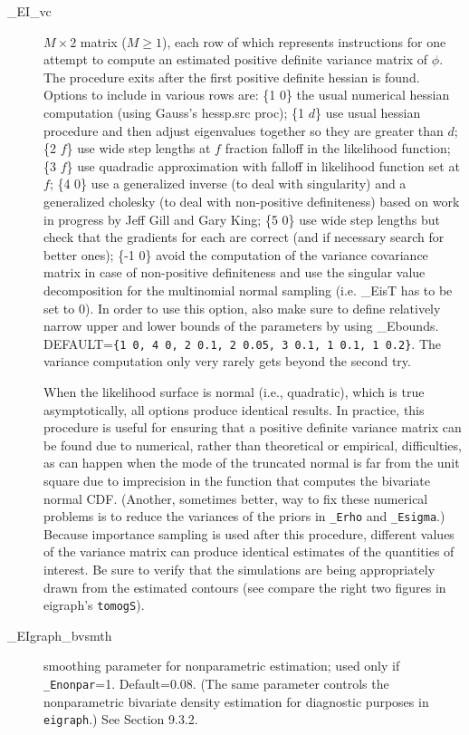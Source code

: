 \documentclass[11pt,titlepage]{article}
\begin{document}
\begin{description}
\item[\_EI\_vc] $M\times 2$ matrix ($M\geq 1$), each row of which
  represents instructions for one attempt to compute an estimated
  positive definite variance matrix of $\phi$.  The procedure exits
  after the first positive definite hessian is found.  Options to
  include in various rows are: \{1 0\} the usual numerical hessian
  computation (using Gauss's hessp.src proc); \{1 $d$\} use usual
  hessian procedure and then adjust eigenvalues together so they are
  greater than $d$; \{2 $f$\} use wide step lengths at $f$ fraction
  falloff in the likelihood function; \{3 $f$\} use quadradic
  approximation with falloff in likelihood function set at $f$; \{4
  0\} use a generalized inverse (to deal with singularity) and a
  generalized cholesky (to deal with non-positive definiteness) based
  on work in progress by Jeff Gill and Gary King; \{5 0\} use wide
  step lengths but check that the gradients for each are correct (and
  if necessary search for better ones); \{-1 0\} avoid the computation
  of the variance covariance matrix in case of non-positive
  definiteness and use the singular value decomposition for the
  multinomial normal sampling (i.e. \_EisT has to be set to 0). In
  order to use this option, also make sure to define relatively narrow
  upper and lower bounds of the parameters by using \_Ebounds.
  DEFAULT=\texttt{\{1 0, 4 0, 2 0.1, 2 0.05, 3 0.1, 1 0.1, 1 0.2\}}.
  The variance computation only very rarely gets beyond the second
  try.

  When the likelihood surface is normal (i.e., quadratic), which is
  true asymptotically, all options produce identical results.  In
  practice, this procedure is useful for ensuring that a positive
  definite variance matrix can be found due to numerical, rather than
  theoretical or empirical, difficulties, as can happen when the mode
  of the truncated normal is far from the unit square due to
  imprecision in the function that computes the bivariate normal CDF.
  (Another, sometimes better, way to fix these numerical problems is
  to reduce the variances of the priors in \texttt{\_Erho} and
  \texttt{\_Esigma}.)  Because importance sampling is used after this
  procedure, different values of the variance matrix can produce
  identical estimates of the quantities of interest.  Be sure to
  verify that the simulations are being appropriately drawn from the
  estimated contours (see compare the right two figures in eigraph's
  \texttt{tomogS}).

\item[\_EIgraph\_bvsmth] smoothing parameter for nonparametric
  estimation; used only if \texttt{\_Enonpar}=1. Default=0.08.  (The
  same parameter controls the nonparametric bivariate density
  estimation for diagnostic purposes in \texttt{eigraph}.)  See
  Section 9.3.2.


\end{description}
\end{document}
